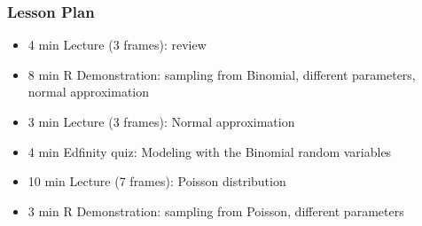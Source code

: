 \begin{frame}
    \frametitle{Lesson Plan}
    \begin{itemize}
        \item 4 min Lecture (3 frames): review
        \item 8 min R Demonstration: sampling from Binomial, different parameters, normal approximation
        \item 3 min Lecture (3 frames): Normal approximation
        \item 4 min Edfinity quiz: Modeling with the Binomial random variables
        
        \item 10 min Lecture (7 frames): Poisson distribution
        \item 3 min R Demonstration: sampling from Poisson, different parameters
        
    \end{itemize}
\end{frame}
    


